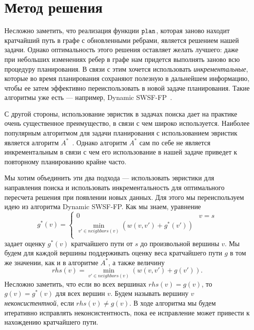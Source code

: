 \documentclass[11pt]{article}
\begin{document}
    \section{Метод решения}

    Несложно заметить, что реализация функции \(\mathtt{plan}\), которая заново находит кратчайший путь в графе с обновленными ребрами, является решением нашей задачи.
    Однако оптимальность этого решения оставляет желать лучшего: даже при небольших изменениях ребер в графе нам придется выполнять заново всю процедуру планирования.
    В связи с этим хочется использовать \textit{инкрементальные}, которые во время планирования сохраняют полезную в дальнейшем информацию, чтобы ее затем эффективно переиспользовать в новой задаче планирования.
    Такие алгоритмы уже есть --- например, Dynamic SWSF-FP~\cite{RAMALINGAM1996267}.

    С другой стороны, использование эвристик в задачах поиска дает на практике очень существенное преимущество, в связи с чем широко используется.
    Наиболее популярным алгоритмом для задачи планирования с использованием эвристик является алгоритм $A^*$~\cite{Nilsson1971ProblemsolvingMI}.
    Однако алгоритм $A^*$ сам по себе не является инкрементальным в связи с чем его использование в нашей задаче приведет к повторному планированию крайне часто.

    Мы хотим объединить эти два подхода --- использовать эвристики для направления поиска и использовать инкрементальность для оптимального пересчета решения при появлении новых данных.
    Для этого мы переиспользуем идею из алгоритма Dynamic SWSF-FP.
    Как мы знаем, уравнение \[ g^*(v) = \begin{cases}
                                            0 &  v = s\\
                                            \min_{v' \in neighbors(v)} (w(v, v') + g^*(v')) \\
    \end{cases} \]
    задает оценку $g^*(v)$ кратчайшего пути от $s$ до произвольной вершины $v$.
    Мы будем для каждой вершины поддерживать оценку веса кратчайшего пути $g$ в том же значении, как и в алгоритме $A^*$, а также
    величину \[rhs(v) = \min_{v' \in neighbors(v)} (w(v, v') + g(v')). \]
    Несложно заметить, что если во всех вершинах $rhs(v) = g(v)$, то $g(v) = g^*(v)$ для всех вершин $v$.
    Будем называть вершину $v$ \textit{неконсистентной}, если $rhs(v) \neq g(v)$.
    В ходе алгоритма мы будем итеративно исправлять неконсистентность, пока ее исправление может привести к нахождению кратчайшего пути.
\end{document}
